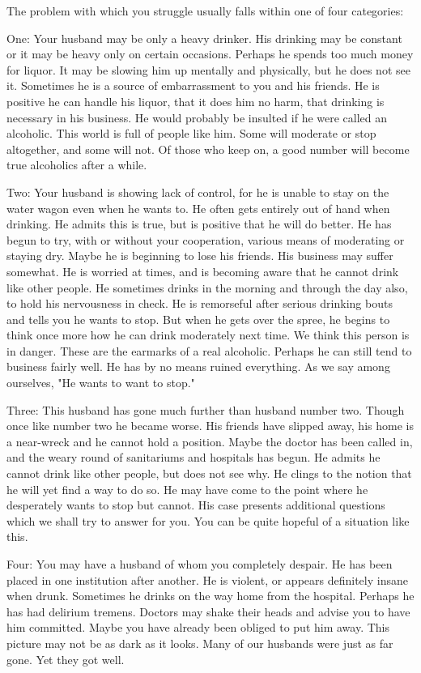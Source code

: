 \begin{biblechapter}
The problem with which you struggle usually falls within one of four categories:

One:  Your husband may be only a heavy drinker.  His drinking may be constant or it may be heavy only on certain occasions.  Perhaps he spends too much money for liquor.  It may be slowing him up mentally and physically, but he does not see it.  Sometimes he is a source of embarrassment to you and his friends.  He is positive he can handle his liquor, that it does him no harm, that drinking is necessary in his business.  He would probably be insulted if he were called an alcoholic.  This world is full of people like him.  Some will moderate or stop altogether, and some will not.  Of those who keep on, a good number will become true alcoholics after a while.

Two:  Your husband is showing lack of control, for he is unable to stay on the water wagon even when he wants to.  He often gets entirely out of hand when drinking.  He admits this is true, but is positive that he will do better.  He has begun to try, with or without your cooperation, various means of moderating or staying dry.  Maybe he is beginning to lose his friends.  His business may suffer somewhat.  He is worried at times, and is becoming aware that he cannot drink like other people.  He sometimes drinks in the morning and through the day also, to hold his nervousness in check.  He is remorseful after serious drinking bouts and tells you he wants to stop.  But when he gets over the spree, he begins to think once more how he can drink moderately next time.  We think this person is in danger.  These are the earmarks of a real alcoholic.  Perhaps he can still tend to business fairly well.  He has by no means ruined everything.  As we say among ourselves, "He wants to want to stop."

Three:  This husband has gone much further than husband number two.  Though once like number two he became worse.  His friends have slipped away, his home is a near-wreck and he cannot hold a position.  Maybe the doctor has been called in, and the weary round of sanitariums and hospitals has begun.  He admits he cannot drink like other people, but does not see why.  He clings to the notion that he will yet find a way to do so.  He may have come to the point where he desperately wants to stop but cannot.  His case presents additional questions which we shall try to answer for you.  You can be quite hopeful of a situation like this.

Four:  You may have a husband of whom you completely despair.  He has been placed in one institution after another.  He is violent, or appears definitely insane when drunk.  Sometimes he drinks on the way home from the hospital.  Perhaps he has had delirium tremens.  Doctors may shake their heads and advise you to have him committed.  Maybe you have already been obliged to put him away.  This picture may not be as dark as it looks.  Many of our husbands were just as far gone.  Yet they got well.


\end{biblechapter}
